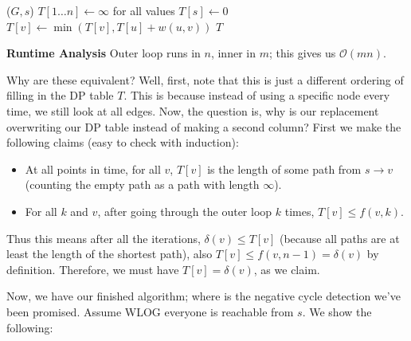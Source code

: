 \begin{algothm}
    \begin{algorithmic}
    ($G, s$)
        \State $T[1 \dots n] \gets \infty$ for all values
        \State $T[s] \gets 0$
                \State $T[v] \gets \min(T[v], T[u] + w(u, v))$
            \EndFor
        \EndFor
        \State \Return $T$
    \EndFunction
    \end{algorithmic}

    \textbf{Runtime Analysis} Outer loop runs in $n$, inner in $m$; this gives us $\mathcal{O}(mn)$.

    Why are these equivalent? Well, first, note that this is just a different ordering of filling in the DP table $T$.
    This is because instead of using a specific node every time, we still look at all edges. Now, the question is, why is our replacement
    overwriting our DP table instead of making a second column? First we make the following claims (easy to check with induction):

    \begin{itemize}
        \item At all points in time, for all $v$, $T[v]$ is the length of some path from $s \to v$ (counting the empty path as a path with length $\infty$).
        \item For all $k$ and $v$, after going through the outer loop $k$ times, $T[v] \leq f(v, k)$.
    \end{itemize}

    Thus this means after all the iterations, $\delta(v) \leq T[v]$ (because all paths are at least the length of the shortest path), also $T[v] \leq f(v, n - 1) = \delta(v)$
    by definition. Therefore, we must have $T[v] = \delta(v)$, as we claim.
\end{algothm}

Now, we have our finished algorithm; where is the negative cycle detection we've been promised. Assume WLOG everyone is reachable from $s$. We show the following:

